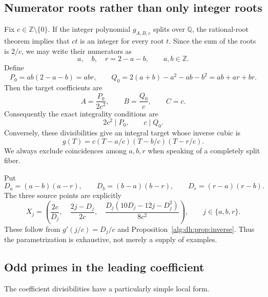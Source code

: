 \documentclass[11pt]{article}
\numberwithin{equation}{section}
\theoremstyle{plain}
\theoremstyle{plain}
\theoremstyle{plain}
\theoremstyle{definition}
\theoremstyle{definition}
\theoremstyle{definition}
\theoremstyle{remark}
\newcommand{\Z}{\mathbb Z}\newcommand{\Q}{\mathbb Q}
\begin{document}
\subsection{Numerator roots rather than only integer roots}
Fix $c\in\Z\setminus\{0\}$. If the integer polynomial $g_{A,B,c}$
splits over $\Q$, the rational-root theorem implies that $ct$ is an
integer for every root $t$. Since the sum of the roots is $2/c$, we may
write their numerators as
\begin{equation}\label{alg:dh:eq:numerator-roots}
 a,\quad b,\quad r=2-a-b,\qquad a,b\in\Z.
\end{equation}
Define
\begin{equation}\label{alg:dh:eq:PQ}
 P_0=ab(2-a-b)=abr,\qquad
 Q_0=2(a+b)-a^2-ab-b^2=ab+ar+br.
\end{equation}
Then the target coefficients are
\begin{equation}\label{alg:dh:eq:coefficients}
 A=\frac{P_0}{2c^2},\qquad B=\frac{Q_0}{c},\qquad C=c.
\end{equation}
Consequently the exact integrality conditions are
\begin{equation}\label{alg:dh:eq:integrality-divisibility}
 2c^2\mid P_0,\qquad c\mid Q_0.
\end{equation}
Conversely, these divisibilities give an integral target whose inverse
cubic is
\begin{equation}\label{alg:dh:eq:factor}
 g(T)=c(T-a/c)(T-b/c)(T-r/c).
\end{equation}
We always exclude coincidences among $a,b,r$ when speaking of a completely
split fiber.

Put
\begin{equation}\label{alg:dh:eq:D}
 D_a=(a-b)(a-r),\qquad D_b=(b-a)(b-r),\qquad D_r=(r-a)(r-b).
\end{equation}
The three source points are explicitly
\begin{equation}\label{alg:dh:eq:numerator-inverse}
 X_j=\left(
 \frac{2c}{D_j},\quad \frac{2j-D_j}{2c},\quad
 \frac{D_j(10D_j-12j-D_j^2)}{8c^2}
 \right),\qquad j\in\{a,b,r\}.
\end{equation}
These follow from $g'(j/c)=D_j/c$ and Proposition~\ref{alg:dh:prop:inverse}.
Thus the parametrization is exhaustive, not merely a supply of examples.

\subsection{Odd primes in the leading coefficient}
The coefficient divisibilities have a particularly simple local form.
\end{document}

